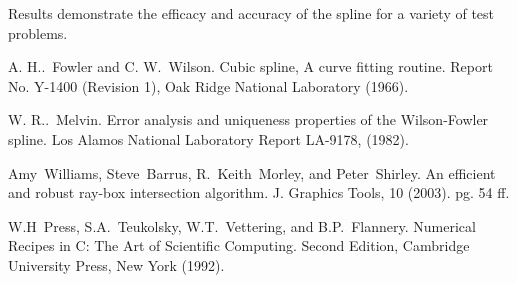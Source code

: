 Results demonstrate the efficacy and accuracy of the spline for a variety of test problems.


\begin{thebibliography}{10}
{\sc A. H..~Fowler and C. W.~Wilson}. {Cubic spline, A curve fitting routine}. Report No. Y-1400 (Revision 1), Oak Ridge National Laboratory (1966).

{\sc W. R..~Melvin}. {Error analysis and uniqueness properties of the Wilson-Fowler spline}. Los Alamos National Laboratory Report LA-9178, (1982).

{\sc Amy~Williams, Steve~Barrus, R.~Keith~Morley, and Peter~Shirley}. {An efficient and robust ray-box intersection algorithm}. J. Graphics Tools, 10 (2003). pg. 54 ff.

{\sc W.H~Press, S.A.~Teukolsky, W.T.~Vettering, and B.P.~Flannery}. {Numerical Recipes in C: The Art of Scientific Computing}. Second Edition, Cambridge University Press, New York (1992).
\end{thebibliography}